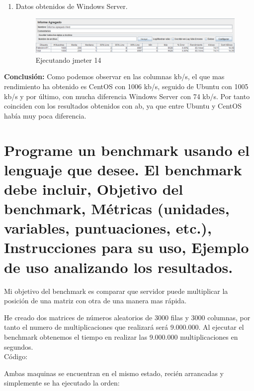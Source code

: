 \begin{enumerate}
	\item Datos obtenidos de Windows Server.

	\begin{figure}[H] %
		\centering
		\includegraphics[scale=0.5]{pics/14}  %
		\caption{Ejecutando jmeter 14} \label{fig:jmt14}
	\end{figure}
\end{enumerate}

\textbf{Conclusión: } Como podemos observar en las columnas kb/s, el que mas rendimiento ha obtenido es CentOS con 1006 kb/s, seguido de Ubuntu con 1005 kb/s y por último, con mucha diferencia Windows Server con 74 kb/s. Por tanto coinciden con los resultados obtenidos con ab, ya que entre Ubuntu y CentOS había muy poca diferencia.



\section[Cuestión 5]{ Programe un benchmark usando el lenguaje que desee. El benchmark debe incluir, Objetivo del benchmark, Métricas (unidades, variables, puntuaciones, etc.), Instrucciones para su uso, Ejemplo de uso analizando los resultados.}

Mi objetivo del benchmark es comparar que servidor puede multiplicar la posición de una matriz con otra de una manera mas rápida.

He creado dos matrices de números aleatorios de 3000 filas y 3000 columnas, por tanto el numero de multiplicaciones que realizará será 9.000.000.
Al ejecutar el benchmark obtenemos el tiempo en realizar las 9.000.000 multiplicaciones en segundos.\\

Código:



Ambas maquinas se encuentran en el mismo estado, recién arrancadas y simplemente se ha ejecutado la orden:\\

